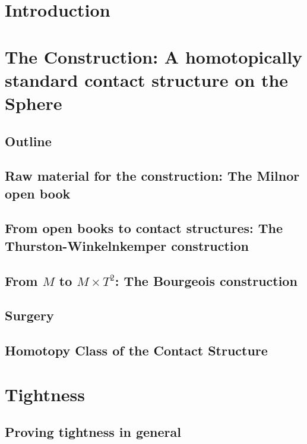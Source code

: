 \documentclass[oneside]{amsbook}
\begin{document}
\tableofcontents

\chapter{Introduction}


\chapter[Construction]{The Construction: A homotopically standard contact structure on the Sphere}
\section{Outline}

\section[The Milnor open book]{Raw material for the construction: The Milnor open book} \label{sec:milnor}

\section[The Thurston-Winkelnkemper-construction]{From open books to contact structures: The Thurston-Winkelnkemper construction}

\section[The Bourgeois construction]{From $M$ to $M\times T^2$: The Bourgeois construction}


\section{Surgery}



\section[Homotopically standard]{Homotopy Class of the Contact Structure} \label{homotopically_standard}


\chapter{Tightness}
\section{Proving tightness in general}

\end{document}

